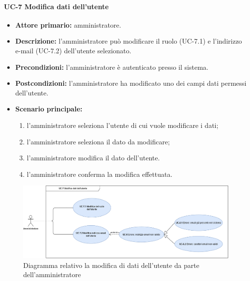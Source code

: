 \paragraph{UC-7 Modifica dati dell'utente}
\begin{itemize}
	\item \textbf{Attore primario:} amministratore.

	\item \textbf{Descrizione:} l'amministratore può modificare il ruolo (UC-7.1) e l'indirizzo e-mail (UC-7.2) dell'utente selezionato.
	
	\item \textbf{Precondizioni:} l'amministratore è autenticato presso il sistema.

	\item \textbf{Postcondizioni:} l'amministratore ha modificato uno dei campi dati permessi dell'utente.

	\item \textbf{Scenario principale:}
	\begin{enumerate}
    	\item  l'amministratore seleziona l'utente di cui vuole modificare i dati;
    	\item  l'amministratore seleziona il dato da modificare;
    	\item l'amministratore modifica il dato dell'utente.
    	\item l'amministratore conferma la modifica effettuata.
	\end{enumerate}
\end{itemize}

\begin{figure}[H]
    \centering
      \includegraphics[scale=0.35]{src/CasiDUso/immagini/ModificaUtente.png}
    \caption{Diagramma relativo la modifica di dati dell'utente da parte dell'amministratore}
\end{figure}
    
